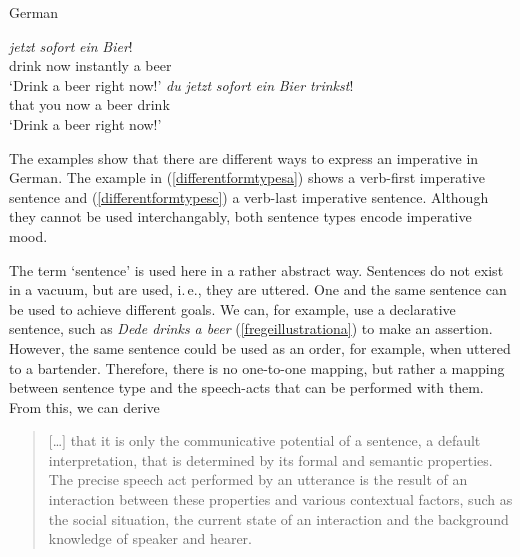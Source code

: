 \begin{exe}
\ex German \label{differntdorm}\begin{xlist} 
\ex {} {\textit{jetzt}} {\textit{sofort}} {\textit{ein}} {\textit{Bier}!}  \\
{drink} {now} {instantly} {a} {beer} \\
\trans `Drink a beer right now!' \label{differentformtypesa}
\ex {} {\textit{du}} {\textit{jetzt}} {\textit{sofort}} {\textit{ein}} {\textit{Bier}} {\textit{trinkst}!}\\
{that} {you} {now} {a} {beer} {drink} \\
\trans `Drink a beer right now!' \label{differentformtypesc}
\end{xlist}
\end{exe} 

\noindent The examples show that there are different ways to express an imperative in German. The example in (\ref{differentformtypesa}) shows a verb-first imperative sentence and (\ref{differentformtypesc}) a verb-last imperative sentence. Although they cannot be used interchangably, both sentence types encode imperative mood.

The term `sentence' is used here in a rather abstract way. Sentences do not exist in a vacuum, but are used, i.\,e., they are uttered. One and the same sentence can be used to achieve different goals. We can, for example, use a declarative sentence, such as \textit{Dede drinks a beer} (\ref{fregeillustrationa}) to make an assertion. However, the same sentence could be used as an order, for example, when uttered to a bartender. Therefore, there is no one-to-one mapping, but rather a mapping between sentence type and the speech-acts that can be performed with them. From this, we can derive 

\begin{quote}
$[$\dots $]$ that it is only the communicative potential of a sentence, a default interpretation, that is determined by its formal and semantic properties. The precise speech act performed by an utterance is the result of an interaction between these properties and various contextual factors, such as the social situation, the current state of an interaction and the background knowledge of speaker and hearer. \citep[277]{konig2007speech}
\end{quote} 

